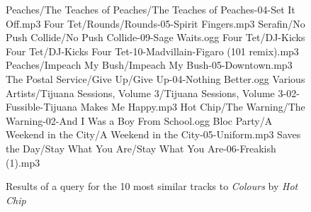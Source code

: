\begin{figure}[p]
	\caption{Results of a query for the 10 most similar tracks to \emph{Colours} by \emph{Hot Chip}}
	\label{fig:testing:user:similarity:b}
	\begin{listing}{1}
Peaches/The Teaches of Peaches/The Teaches of Peaches-04-Set It Off.mp3
Four Tet/Rounds/Rounds-05-Spirit Fingers.mp3
Serafin/No Push Collide/No Push Collide-09-Sage Waits.ogg
Four Tet/DJ-Kicks Four Tet/DJ-Kicks Four Tet-10-Madvillain-Figaro (101 remix).mp3
Peaches/Impeach My Bush/Impeach My Bush-05-Downtown.mp3
The Postal Service/Give Up/Give Up-04-Nothing Better.ogg
Various Artists/Tijuana Sessions, Volume 3/Tijuana Sessions, Volume 3-02-Fussible-Tijuana Makes Me Happy.mp3
Hot Chip/The Warning/The Warning-02-And I Was a Boy From School.ogg
Bloc Party/A Weekend in the City/A Weekend in the City-05-Uniform.mp3
Saves the Day/Stay What You Are/Stay What You Are-06-Freakish (1).mp3
\end{listing}
\end{figure}
